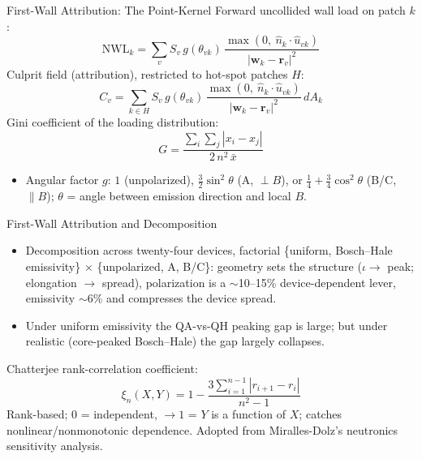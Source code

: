 \documentclass[aspectratio=169]{beamer}
\begin{document}
\begin{frame}{First-Wall Attribution: The Point-Kernel}
  \footnotesize
  Forward uncollided wall load on patch $k$:
  \[
    \mathrm{NWL}_k = \sum_{v} S_v\, g(\theta_{vk})\,
      \frac{\max(0,\ \hat{n}_k\cdot\hat{u}_{vk})}{|\mathbf{w}_k-\mathbf{r}_v|^2}
  \]
  Culprit field (attribution), restricted to hot-spot patches $H$:
  \[
    C_v = \sum_{k\in H} S_v\, g(\theta_{vk})\,
      \frac{\max(0,\ \hat{n}_k\cdot\hat{u}_{vk})}{|\mathbf{w}_k-\mathbf{r}_v|^2}\, dA_k
  \]
  Gini coefficient of the loading distribution:
  \[
    G = \frac{\sum_i \sum_j |x_i - x_j|}{2\, n^2\, \bar{x}}
  \]
  \begin{itemize}
    \item Angular factor $g$: $1$ (unpolarized), $\tfrac{3}{2}\sin^2\theta$
      (A, $\perp B$), or $\tfrac{1}{4}+\tfrac{3}{4}\cos^2\theta$ (B/C, $\parallel B$);
      $\theta$ = angle between emission direction and local $B$.
  \end{itemize}
\end{frame}

\begin{frame}{First-Wall Attribution and Decomposition}
  \footnotesize
  \begin{itemize}
    \item Decomposition across twenty-four devices, factorial
      \{uniform, Bosch--Hale emissivity\} $\times$ \{unpolarized, A, B/C\}:
      geometry sets the structure ($\iota\!\to\!$ peak; elongation $\to$ spread),
      polarization is a $\sim$10--15\% device-dependent lever, emissivity
      $\sim$6\% and compresses the device spread.
    \item Under uniform emissivity the QA-vs-QH peaking gap is large; but under
      realistic (core-peaked Bosch--Hale) the gap largely collapses.
  \end{itemize}
  \begin{tcolorbox}[colback=key!5,colframe=key!60,boxsep=2pt,left=4pt,right=4pt,top=2pt,bottom=2pt]
    \small
    Chatterjee rank-correlation coefficient:
    \[
      \xi_n(X,Y) = 1 - \frac{3\sum_{i=1}^{n-1}|r_{i+1}-r_i|}{n^2-1}
    \]
    Rank-based; $0$ = independent, $\to 1$ = $Y$ is a function of $X$; catches
    nonlinear/nonmonotonic dependence. Adopted from Miralles-Dolz's neutronics
    sensitivity analysis.
  \end{tcolorbox}
\end{frame}
\end{document}
